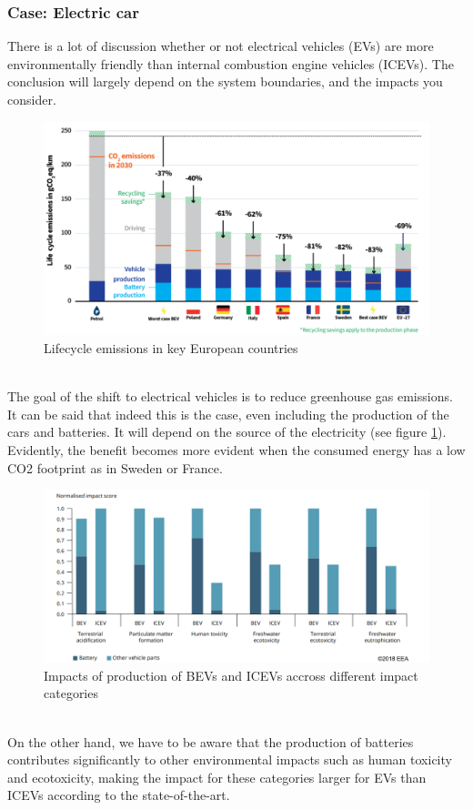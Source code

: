 \documentclass[../summary.tex]{subfiles}
\begin{document}
\subsubsection{Case: Electric car}

There is a lot of discussion whether or not electrical vehicles (EVs) are more environmentally friendly than internal combustion engine vehicles (ICEVs). The conclusion will largely depend on the system boundaries, and the impacts you consider.

\begin{figure}[H]
	\centering
	\includegraphics[width=0.9\linewidth]{../images/lca_emissions_electric_cars}
	\caption{Lifecycle emissions in key European countries}
	\label{fig:lcaemissionselectriccars}
\end{figure}
\ \\
The goal of the shift to electrical vehicles is to reduce greenhouse gas emissions. It can be said that indeed this is the case, even including the production of the cars and batteries. It will depend on the source of the electricity (see figure \ref{fig:lcaemissionselectriccars}). Evidently, the benefit becomes more evident when the consumed energy has a low CO2 footprint as in Sweden or France.

\begin{figure}[H]
	\centering
	\includegraphics[width=0.9\linewidth]{../images/impacts_of_production_of_ICEV_and_BEV}
	\caption{Impacts of production of BEVs and ICEVs accross different impact categories}
	\label{fig:impactsofproductionoficevandbev}
\end{figure}
\ \\
On the other hand, we have to be aware that the production of batteries contributes significantly to other environmental impacts such as human toxicity and ecotoxicity, making the impact for these categories larger for EVs than ICEVs according to the state-of-the-art.
\end{document}
